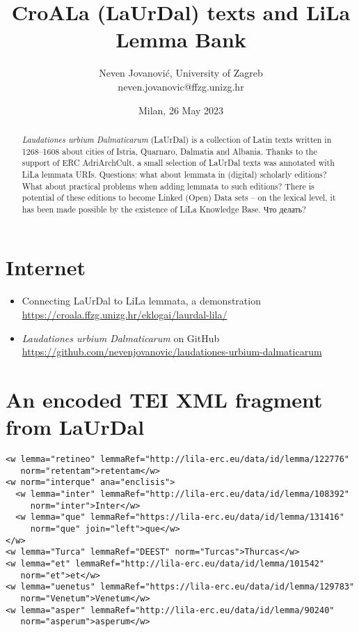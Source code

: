 \documentclass[a4paper,11pt]{article}
\author{Neven Jovanović, University of Zagreb\\
neven.jovanovic@ffzg.unizg.hr}
\date{Milan, 26 May 2023}
\title{CroALa (LaUrDal) texts and LiLa Lemma Bank}
\begin{document}
\maketitle

\begin{abstract}
\noindent \textit{Laudationes urbium Dalmaticarum} (LaUrDal) is a collection of Latin texts written in 1268–1608 about cities of Istria, Quarnaro, Dalmatia and Albania. Thanks to the support of ERC AdriArchCult, a small selection of LaUrDal texts was annotated with LiLa lemmata URIs. Questions: what about lemmata in (digital) scholarly editions? What about practical problems when adding lemmata to such editions? There is potential of these editions to become Linked (Open) Data sets – on the lexical level, it has been made possible by the existence of LiLa Knowledge Base. Что делать?
\end{abstract}

\section*{Internet}

\begin{itemize}
\item Connecting LaUrDal to LiLa lemmata, a demonstration \\
  \url{https://croala.ffzg.unizg.hr/eklogai/laurdal-lila/}
\item \textit{Laudationes urbium Dalmaticarum} on GitHub \\
  \url{https://github.com/nevenjovanovic/laudationes-urbium-dalmaticarum}
\end{itemize}

\thispagestyle{empty}

\section*{An encoded TEI XML fragment from LaUrDal}

\begin{small}
\begin{verbatim}
<w lemma="retineo" lemmaRef="http://lila-erc.eu/data/id/lemma/122776"
   norm="retentam">retentam</w>
<w norm="interque" ana="enclisis">
  <w lemma="inter" lemmaRef="http://lila-erc.eu/data/id/lemma/108392"
     norm="inter">Inter</w>
  <w lemma="que" lemmaRef="https://lila-erc.eu/data/id/lemma/131416"
     norm="que" join="left">que</w>
</w>
<w lemma="Turca" lemmaRef="DEEST" norm="Turcas">Thurcas</w>
<w lemma="et" lemmaRef="http://lila-erc.eu/data/id/lemma/101542"
   norm="et">et</w>
<w lemma="uenetus" lemmaRef="https://lila-erc.eu/data/id/lemma/129783"
   norm="Venetum">Venetum</w>
<w lemma="asper" lemmaRef="http://lila-erc.eu/data/id/lemma/90240"
   norm="asperum">asperum</w>
\end{verbatim}
\end{small}

\end{document}
